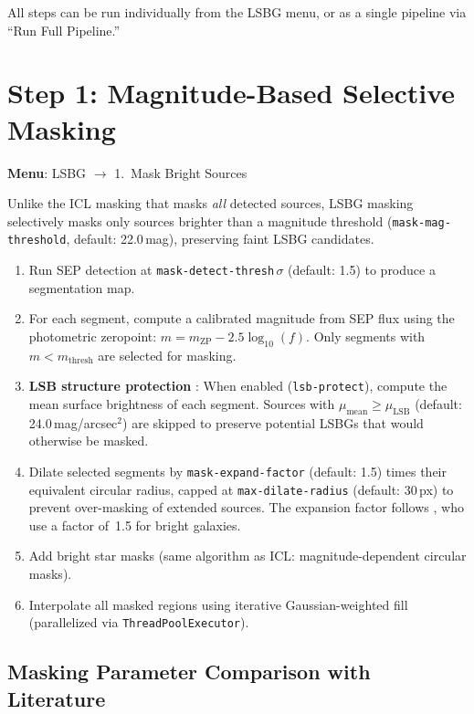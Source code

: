 \documentclass[11pt,fleqn]{book}
\begin{document}
All steps can be run individually from the LSBG menu, or as a single pipeline via ``Run Full Pipeline.''


\section{Step 1: Magnitude-Based Selective Masking}
\label{sec:lsbg-mask}

\textbf{Menu}: LSBG $\to$ 1.\ Mask Bright Sources

Unlike the ICL masking that masks \emph{all} detected sources, LSBG masking selectively masks only sources brighter than a magnitude threshold (\texttt{mask-mag-threshold}, default: 22.0\,mag), preserving faint LSBG candidates.

\begin{enumerate}[leftmargin=2em]
  \item Run SEP detection at \texttt{mask-detect-thresh}$\,\sigma$ (default: 1.5) to produce a segmentation map.
  \item For each segment, compute a calibrated magnitude from SEP flux using the photometric zeropoint: $m = m_\mathrm{ZP} - 2.5\log_{10}(f)$.  Only segments with $m < m_\mathrm{thresh}$ are selected for masking.
  \item \textbf{LSB structure protection} \parencite{greco2018}: When enabled (\texttt{lsb-protect}), compute the mean surface brightness of each segment.  Sources with $\mu_\mathrm{mean} \geq \mu_\mathrm{LSB}$ (default: 24.0\,mag/arcsec$^2$) are skipped to preserve potential LSBGs that would otherwise be masked.
  \item Dilate selected segments by \texttt{mask-expand-factor} (default: 1.5) times their equivalent circular radius, capped at \texttt{max-dilate-radius} (default: 30\,px) to prevent over-masking of extended sources.  The expansion factor follows \textcite{prole2018}, who use a factor of~1.5 for bright galaxies.
  \item Add bright star masks (same algorithm as ICL: magnitude-dependent circular masks).
  \item Interpolate all masked regions using iterative Gaussian-weighted fill (parallelized via \texttt{ThreadPoolExecutor}).
\end{enumerate}

\subsection{Masking Parameter Comparison with Literature}
\end{document}

